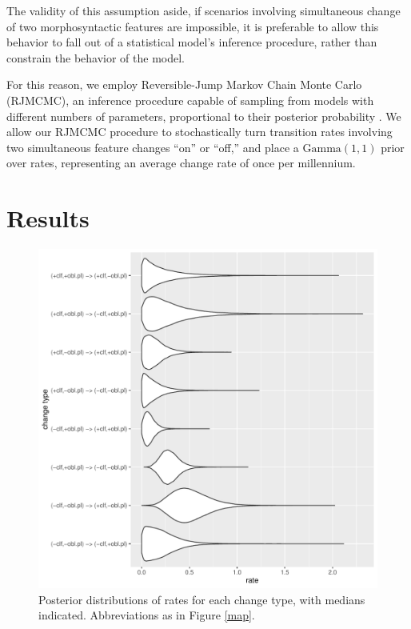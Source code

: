 \documentclass[11pt]{article}
\begin{document}
{%
The validity of this assumption aside, if scenarios involving simultaneous change of two morphosyntactic features are impossible, it is preferable to allow this behavior to fall out of a statistical model's inference procedure, rather than constrain the behavior of the model.

For this reason, we employ Reversible-Jump Markov Chain Monte Carlo (RJMCMC), an inference procedure capable of sampling from models with different numbers of parameters, proportional to their posterior probability \citep{PagelMeade2006}. 
We allow our RJMCMC procedure to stochastically turn transition rates involving two simultaneous feature changes ``on'' or ``off,'' and place a $\text{Gamma}(1,1)$ prior over rates, representing an average change rate of once per millennium. 
}


\section{Results}

\begin{figure}
\includegraphics[width=.9\linewidth]{code/all_rates.pdf}
\caption{Posterior distributions of rates for each change type, with medians indicated. Abbreviations as in Figure \ref{map}.}
\label{all_rates}
\end{figure}
\end{document}
